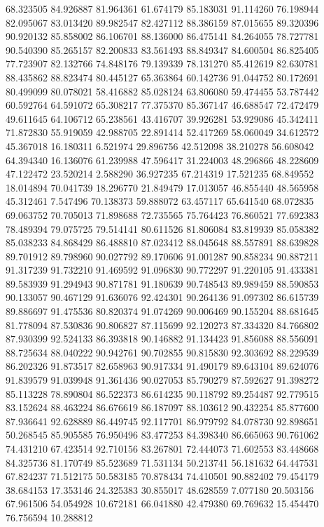 68.323505
84.926887
81.964361
61.674179
85.183031
91.114260
76.198944
82.095067
83.013420
89.982547
82.427112
88.386159
87.015655
89.320396
90.920132
85.858002
86.106701
88.136000
86.475141
84.264055
78.727781
90.540390
85.265157
82.200833
83.561493
88.849347
84.600504
86.825405
77.723907
82.132766
74.848176
79.139339
78.131270
85.412619
82.630781
88.435862
88.823474
80.445127
65.363864
60.142736
91.044752
80.172691
80.499099
80.078021
58.416882
85.028124
63.806080
59.474455
53.787442
60.592764
64.591072
65.308217
77.375370
85.367147
46.688547
72.472479
49.611645
64.106712
65.238561
43.416707
39.926281
53.929086
45.342411
71.872830
55.919059
42.988705
22.891414
52.417269
58.060049
34.612572
45.367018
16.180311
6.521974
29.896756
42.512098
38.210278
56.608042
64.394340
16.136076
61.239988
47.596417
31.224003
48.296866
48.228609
47.122472
23.520214
2.588290
36.927235
67.214319
17.521235
68.849552
18.014894
70.041739
18.296770
21.849479
17.013057
46.855440
48.565958
45.312461
7.547496
70.138373
59.888072
63.457117
65.641540
68.072835
69.063752
70.705013
71.898688
72.735565
75.764423
76.860521
77.692383
78.489394
79.075725
79.514141
80.611526
81.806084
83.819939
85.058382
85.038233
84.868429
86.488810
87.023412
88.045648
88.557891
88.639828
89.701912
89.798960
90.027792
89.170606
91.001287
90.858234
90.887211
91.317239
91.732210
91.469592
91.096830
90.772297
91.220105
91.433381
89.583939
91.294943
90.871781
91.180639
90.748543
89.989459
88.590853
90.133057
90.467129
91.636076
92.424301
90.264136
91.097302
86.615739
89.886697
91.475536
80.820374
91.074269
90.006469
90.155204
88.681645
81.778094
87.530836
90.806827
87.115699
92.120273
87.334320
84.766802
87.930399
92.524133
86.393818
90.146882
91.134423
91.856088
88.556091
88.725634
88.040222
90.942761
90.702855
90.815830
92.303692
88.229539
86.202326
91.873517
82.658963
90.917334
91.490179
89.643104
89.624076
91.839579
91.039948
91.361436
90.027053
85.790279
87.592627
91.398272
85.113228
78.890804
86.522373
86.614235
90.118792
89.254487
92.779515
83.152624
88.463224
86.676619
86.187097
88.103612
90.432254
85.877600
87.936641
92.628889
86.449745
92.117701
86.979792
84.078730
92.898651
50.268545
85.905585
76.950496
83.477253
84.398340
86.665063
90.761062
74.431210
67.423514
92.710156
83.267801
72.444073
71.602553
83.448668
84.325736
81.170749
85.523689
71.531134
50.213741
56.181632
64.447531
67.824237
71.512175
50.583185
70.878434
74.410501
90.882402
79.454179
38.684153
17.353146
24.325383
30.855017
48.628559
7.077180
20.503156
67.961506
54.054928
10.672181
66.041880
42.479380
69.769632
15.454470
76.756594
10.288812
